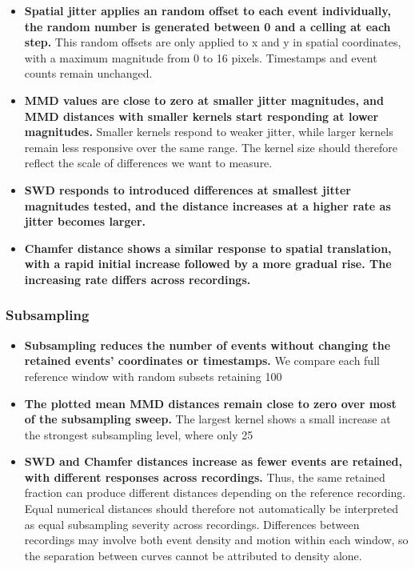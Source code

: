 \begin{itemize}

    \item \textbf{Spatial jitter applies an random offset to each event individually, the random number is generated between 0 and a celling at each step.} This random offsets are only applied to x and y in spatial coordinates, with a maximum magnitude from 0 to 16 pixels. Timestamps and event counts remain unchanged.

    \item \textbf{MMD values are close to zero at smaller jitter magnitudes, and MMD distances with smaller kernels start responding at lower magnitudes.} Smaller kernels respond to weaker jitter, while larger kernels remain less responsive over the same range. The kernel size should therefore reflect the scale of differences we want to measure.

    \item \textbf{SWD responds to introduced differences at smallest jitter magnitudes tested, and the distance increases at a higher rate as jitter becomes larger. }

    \item \textbf{Chamfer distance shows a similar response to spatial translation, with a rapid initial increase followed by a more gradual rise. The increasing rate differs across recordings.}

\end{itemize}

\subsubsection{Subsampling}

\begin{itemize}
    \item \textbf{Subsampling reduces the number of events without changing the retained events’ coordinates or timestamps.} We compare each full reference window with random subsets retaining 100%

    \item \textbf{The plotted mean MMD distances remain close to zero over most of the subsampling sweep.} The largest kernel shows a small increase at the strongest subsampling level, where only 25%

    \item \textbf{SWD and Chamfer distances increase as fewer events are retained, with different responses across recordings.} Thus, the same retained fraction can produce different distances depending on the reference recording. Equal numerical distances should therefore not automatically be interpreted as equal subsampling severity across recordings. Differences between recordings may involve both event density and motion within each window, so the separation between curves cannot be attributed to density alone.
    
\end{itemize}


